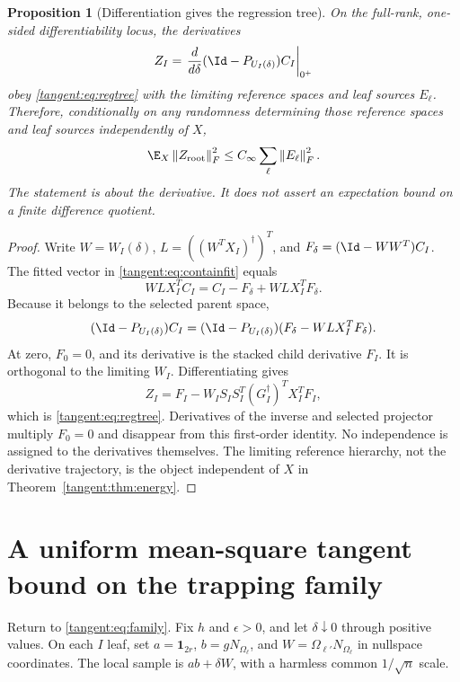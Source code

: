 \documentclass[11pt,oneside,openany,a4paper]{book}
\numberwithin{equation}{chapter}
\newtheorem{proposition}[theorem]{Proposition}
\theoremstyle{definition}
\theoremstyle{remark}
\newcommand{\F}[1]{\left\lVert#1\right\rVert_F}
\begin{document}
\begin{proposition}[Differentiation gives the regression tree]\label{tangent:prop:derivative}
On the full-rank, one-sided differentiability locus, the derivatives
\[
 Z_I=\left.\frac{d}{d\delta}(\Id-P_{U_I(\delta)})C_I\right|_{0^+}
\]
obey \eqref{tangent:eq:regtree} with the limiting reference spaces and leaf sources $E_\ell$. Therefore, conditionally on any randomness determining those reference spaces and leaf sources independently of $X$,
\begin{equation}\label{tangent:eq:tangentbound}
 \E_X\F{Z_{\rm root}}^2\le C_\infty\sum_\ell\F{E_\ell}^2.
\end{equation}
The statement is about the derivative. It does not assert an expectation bound on a finite difference quotient.
\end{proposition}
\begin{proof}
Write $W=W_I(\delta)$, $L=((W^TX_I)^\dagger)^T$, and $F_\delta=(\Id-WW^T)C_I$. The fitted vector in \eqref{tangent:eq:containfit} equals
\[
 WLX_I^TC_I=C_I-F_\delta+WLX_I^TF_\delta.
\]
Because it belongs to the selected parent space,
\[
 (\Id-P_{U_I(\delta)})C_I
 =(\Id-P_{U_I(\delta)})(F_\delta-WLX_I^TF_\delta).
\]
At zero, $F_0=0$, and its derivative is the stacked child derivative $F_I$. It is orthogonal to the limiting $W_I$. Differentiating gives
\[
 Z_I=F_I-W_IS_IS_I^T(G_I^\dagger)^TX_I^TF_I,
\]
which is \eqref{tangent:eq:regtree}. Derivatives of the inverse and selected projector multiply $F_0=0$ and disappear from this first-order identity. No independence is assigned to the derivatives themselves. The limiting reference hierarchy, not the derivative trajectory, is the object independent of $X$ in Theorem~\ref{tangent:thm:energy}.
\end{proof}

\section{A uniform mean-square tangent bound on the trapping family}\label{tangent:sec:application}
Return to \eqref{tangent:eq:family}. Fix $h$ and $\epsilon>0$, and let $\delta\downarrow0$ through positive values. On each $I$ leaf, set $a=\mathbf1_{2r}$, $b=gN_{\Omega_\ell}$, and $W=\Omega_{\ell'}N_{\Omega_\ell}$ in nullspace coordinates. The local sample is $ab+\delta W$, with a harmless common $1/\sqrt n$ scale.
\end{document}
